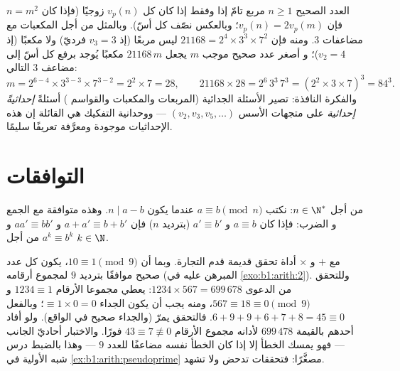 \begin{example}\label{ex:b1:arith:squarecube}
العدد الصحيح $n \geq 1$ مربع تامّ إذا وفقط إذا كان كل
$v_p(n)$ زوجيًا (فإذا كان $n = m^2$ فإن $v_p(n) = 2v_p(m)$؛
وبالعكس نصّف كل أسّ). وبالمثل من أجل المكعبات مع
مضاعفات $3$. ومنه فإن $21168 = 2^4 \times 3^3 \times 7^2$ ليس
مربعًا (إذ $v_3 = 3$ فرديّ) ولا مكعبًا (إذ $v_2 = 4$)؛ و
أصغر عدد صحيح موجب $m$ يجعل $21168\,m$ مكعبًا يُوجد
برفع كل أسّ إلى مضاعف $3$ التالي:
\[
m = 2^{6-4} \times 3^{3-3} \times 7^{3-2} = 2^2 \times 7 = 28,
\qquad
21168 \times 28 = 2^6\,3^3\,7^3 = (2^2 \times 3 \times 7)^3
= 84^3 .
\]
والفكرة النافذة: تصير الأسئلة الجدائية (المربعات والمكعبات والقواسم
 ) أسئلةً \emph{إحداثيةً إحداثية} على متجهات
الأسس $(v_2, v_3, v_5, \dots)$ --- ووحدانية التفكيك هي
 القائلة إن هذه الإحداثيات موجودة ومعرَّفة تعريفًا سليمًا.
\end{example}

\section{التوافقات}

\begin{definition}\label{def:b1:arith:congruence}
من أجل $n \in \N^*$: نكتب $a \equiv b \pmod n$ عندما يكون $n \mid
a - b$. وهذه  متوافقة مع الجمع و
الضرب: فإذا كان $a \equiv b$ و $a' \equiv b'$ (بترديد $n$) فإن
$a + a' \equiv b + b'$ و $aa' \equiv bb'$ و $a^k \equiv b^k$ من أجل
$k \in \N$.
\end{definition}

\begin{example}\label{ex:b1:arith:castingnines}
 مع $+$ و $\times$ أداة تحقق قديمة قدم
التجارة. وبما أن $10 \equiv 1 \pmod 9$، يكون كل عدد صحيح
موافقًا بترديد $9$ لمجموع أرقامه (المبرهن عليه في
\cref{exo:b1:arith:2}). وللتحقق من الدعوى $1234 \times 567 =
699\,678$: يعطي مجموعا الأرقام $1234 \equiv 1$ و$567 \equiv 18
\equiv 0 \pmod 9$، ومنه يجب أن يكون الجداء $\equiv 1 \times 0 =
0$؛ وبالفعل $6 + 9 + 9 + 6 + 7 + 8 = 45 \equiv 0$. فالتحقق
يمرّ (والجداء صحيح في الواقع). ولو أفاد أحدهم بالقيمة
$699\,478$ لأدانه مجموع الأرقام $43 \equiv 7 \not\equiv 0$
فورًا. والاختبار أحاديّ الجانب --- فهو يمسك الخطأ
إلا إذا كان الخطأ نفسه مضاعفًا للعدد $9$ --- وهذا بالضبط
درس شبه الأولية في
\cref{ex:b1:arith:pseudoprime} مصغَّرًا: فتحققات 
تدحض ولا تشهد.
\end{example}

